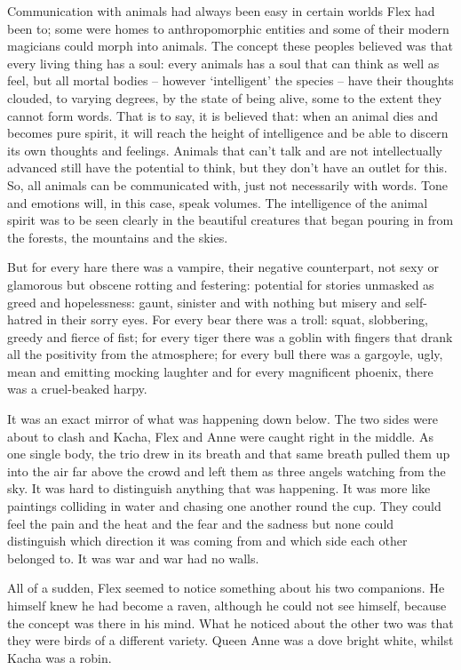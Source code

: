 Communication with animals had always been easy in certain worlds Flex
had been to; some were homes to anthropomorphic entities and some of
their modern magicians could morph into animals. The concept these
peoples believed was that every living thing has a soul: every animals
has a soul that can think as well as feel, but all mortal bodies –
however ‘intelligent’ the species – have their thoughts clouded, to
varying degrees, by the state of being alive, some to the extent they
cannot form words. That is to say, it is believed that: when an animal
dies and becomes pure spirit, it will reach the height of intelligence
and be able to discern its own thoughts and feelings. Animals that
can’t talk and are not intellectually advanced still have the
potential to think, but they don’t have an outlet for this. So, all
animals can be communicated with, just not necessarily with
words. Tone and emotions will, in this case, speak volumes. The
intelligence of the animal spirit was to be seen clearly in the
beautiful creatures that began pouring in from the forests, the
mountains and the skies.

But for every hare there was a vampire, their negative counterpart,
not sexy or glamorous but obscene rotting and festering: potential for
stories unmasked as greed and hopelessness: gaunt, sinister and with
nothing but misery and self-hatred in their sorry eyes. For every bear
there was a troll: squat, slobbering, greedy and fierce of fist; for
every tiger there was a goblin with fingers that drank all the
positivity from the atmosphere; for every bull there was a gargoyle,
ugly, mean and emitting mocking laughter and for every magnificent
phoenix, there was a cruel-beaked harpy.

It was an exact mirror of what was happening down below. The two sides
were about to clash and Kacha, Flex and Anne were caught right in the
middle. As one single body, the trio drew in its breath and that same
breath pulled them up into the air far above the crowd and left them
as three angels watching from the sky. It was hard to distinguish
anything that was happening. It was more like paintings colliding in
water and chasing one another round the cup. They could feel the pain
and the heat and the fear and the sadness but none could distinguish
which direction it was coming from and which side each other belonged
to. It was war and war had no walls.

All of a sudden, Flex seemed to notice something about his two
companions. He himself knew he had become a raven, although he could
not see himself, because the concept was there in his mind. What he
noticed about the other two was that they were birds of a different
variety. Queen Anne was a dove bright white, whilst Kacha was a robin.

